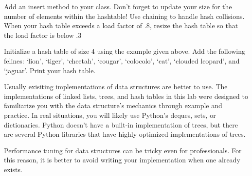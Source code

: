 \begin{problem}
Add an insert method to your  class. Don't forget to update your size for the number of elements within the hashtable!
Use chaining to handle hash collisions.
When your hash table exceeds a load factor of .8, resize the hash table so that the load factor is below .3

Initialize a hash table of size 4 using the example  given above.
Add the following felines: `lion', `tiger', `cheetah', `cougar', `colocolo', `cat', `clouded leopard', and `jaguar'.
Print your hash table.
\label{prob:hash_table}
\end{problem}

\begin{info}
Usually exisiting implementations of data structures are better to use.
The implementations of linked lists, trees, and hash tables in this lab were designed to familiarize you with the data structure's mechanics through example and practice.
In real situations, you will likely use Python's deques, sets, or dictionaries.
Python doesn't have a built-in implementation of trees, but there are several Python libraries that have highly optimized implementations of trees.

Performance tuning for data structures can be tricky even for professionals.
For this reason, it is better to avoid writing your implementation when one already exists.
\end{info}
